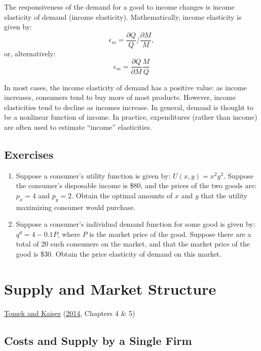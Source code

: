 \documentclass[
  oneside]{book}
\providecommand{\tightlist}{%
  \setlength{\itemsep}{0pt}\setlength{\parskip}{0pt}}
\begin{document}
The responsiveness of the demand for a good to income changes is income elasticity of demand (income elasticity). Mathematically, income elasticity is given by: \[\epsilon_{m} = \frac{\partial Q}{Q}/\frac{\partial M}{M},\] or, alternatively: \[\epsilon_{m} = \frac{\partial Q}{\partial M}\frac{M}{Q}\]

In most cases, the income elasticity of demand has a positive value: as income increases, consumers tend to buy more of most products. However, income elasticities tend to decline as incomes increase. In general, demand is thought to be a nonlinear function of income. In practice, expenditures (rather than income) are often used to estimate ``income'' elasticities.

\hypertarget{exercises}{%
\section*{Exercises}\label{exercises}}

\begin{enumerate}
\def\labelenumi{\arabic{enumi}.}
\tightlist
\item
  Suppose a consumer's utility function is given by: \(U(x,y) = x^2y^3\). Suppose the consumer's disposable income is \$80, and the prices of the two goods are: \(p_x=4\) and \(p_y=2\). Obtain the optimal amounts of \(x\) and \(y\) that the utility maximizing consumer would purchase.
\item
  Suppose a consumer's individual demand function for some good is given by: \(q^d=4-0.1P\), where \(P\) is the market price of the good. Suppose there are a total of 20 such consumers on the market, and that the market price of the good is \$30. Obtain the price elasticity of demand on this market.
\end{enumerate}

\hypertarget{supply-and-market-structure}{%
\chapter{Supply and Market Structure}\label{supply-and-market-structure}}

\protect\hyperlink{ref-tomek2014}{Tomek and Kaiser} (\protect\hyperlink{ref-tomek2014}{2014}, Chapters 4 \& 5)

\hypertarget{costs-and-supply-by-a-single-firm}{%
\section{Costs and Supply by a Single Firm}\label{costs-and-supply-by-a-single-firm}}
\end{document}
